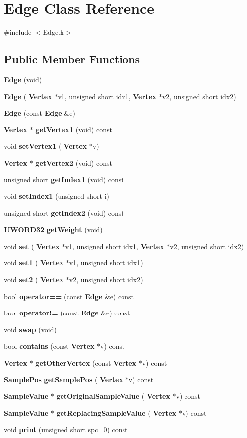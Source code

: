 \section{Edge Class Reference}
\label{classEdge}


{\ttfamily \#include $<$Edge.\+h$>$}

\subsection*{Public Member Functions}
\begin{DoxyCompactItemize}
\item 
\textbf{ Edge} (void)
\item 
\textbf{ Edge} (\textbf{ Vertex} $\ast$v1, unsigned short idx1, \textbf{ Vertex} $\ast$v2, unsigned short idx2)
\item 
\textbf{ Edge} (const \textbf{ Edge} \&e)
\item 
\textbf{ Vertex} $\ast$ \textbf{ get\+Vertex1} (void) const
\item 
void \textbf{ set\+Vertex1} (\textbf{ Vertex} $\ast$v)
\item 
\textbf{ Vertex} $\ast$ \textbf{ get\+Vertex2} (void) const
\item 
unsigned short \textbf{ get\+Index1} (void) const
\item 
void \textbf{ set\+Index1} (unsigned short i)
\item 
unsigned short \textbf{ get\+Index2} (void) const
\item 
\textbf{ U\+W\+O\+R\+D32} \textbf{ get\+Weight} (void)
\item 
void \textbf{ set} (\textbf{ Vertex} $\ast$v1, unsigned short idx1, \textbf{ Vertex} $\ast$v2, unsigned short idx2)
\item 
void \textbf{ set1} (\textbf{ Vertex} $\ast$v1, unsigned short idx1)
\item 
void \textbf{ set2} (\textbf{ Vertex} $\ast$v2, unsigned short idx2)
\item 
bool \textbf{ operator==} (const \textbf{ Edge} \&e) const
\item 
bool \textbf{ operator!=} (const \textbf{ Edge} \&e) const
\item 
void \textbf{ swap} (void)
\item 
bool \textbf{ contains} (const \textbf{ Vertex} $\ast$v) const
\item 
\textbf{ Vertex} $\ast$ \textbf{ get\+Other\+Vertex} (const \textbf{ Vertex} $\ast$v) const
\item 
\textbf{ Sample\+Pos} \textbf{ get\+Sample\+Pos} (\textbf{ Vertex} $\ast$v) const
\item 
\textbf{ Sample\+Value} $\ast$ \textbf{ get\+Original\+Sample\+Value} (\textbf{ Vertex} $\ast$v) const
\item 
\textbf{ Sample\+Value} $\ast$ \textbf{ get\+Replacing\+Sample\+Value} (\textbf{ Vertex} $\ast$v) const
\item 
void \textbf{ print} (unsigned short spc=0) const
\end{DoxyCompactItemize}
